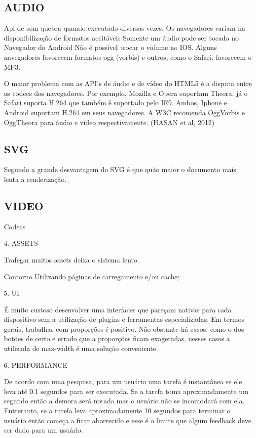 \documentclass[
12pt,
a4paper,
portuges,
draft
]{report}
\begin{document}
\subsection{AUDIO}
Api de som quebra quando executado diversas vezes.
Os navegadores variam na disponibilização de formatos aceitáveis
Somente um áudio pode ser tocado no Navegador do Android
Não é possível trocar o volume no IOS.
Alguns navegadores favorecem formatos ogg (vorbis) e outros, como o
Safari, favorecem o MP3.

O maior problema com as API's de áudio e de vídeo do HTML5 é
a disputa entre os codecs dos navegadores. Por exemplo, Mozilla e
Opera suportam Theora, já o Safari suporta H.264 que também é
suportado pelo IE9. Ambos, Iphone e Android suportam H.264 em seus
navegadores. A W3C recomenda OggVorbis e OggTheora para áudio e vídeo
respectivamente. (HASAN et al, 2012)

\subsection{SVG}

Segundo \cite{html5mostwanted} a grande desvantagem do SVG é que quão maior o documento mais lenta a renderização.

\subsection{VIDEO}


Codecs

4. ASSETS

Trafegar muitos assets deixa o sistema lento.

 Contorno
Utilizando páginas de carregamento e/ou cache;

5. UI

É muito custoso desenvolver uma interfaces que pareçam nativas
para cada dispositivo sem a utilização de plugins e ferramentas
especializadas. Em termos gerais, trabalhar com proporções é
positivo. Não obstante
há casos, como o dos botões de certo e errado que a proporções ficam
exageradas, nesses casos a utilizada de max-width é uma solução
conveniente.

6. PERFORMANCE

De acordo com uma pesquisa, para um usuário uma tarefa é instantânea
se ele leva até 0.1 segundos para ser executada. Se a tarefa toma
aproximadamente um segundo então a demora será notada mas o
usuário não se incomodará com ela. Entretanto, se a tarefa leva
aproximadamente 10 segundos para terminar o usuário então começa a
ficar aborrecido e esse é o limite que algum feedback deve ser dado
para um usuário.
\end{document}
